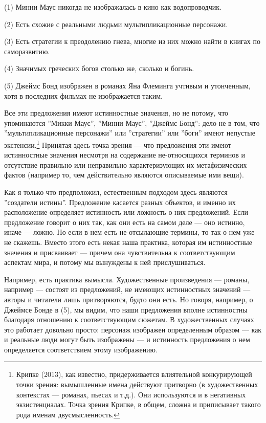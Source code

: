 \documentclass[11pt]{book}
\begin{document}
\smallskip

(1) Минни Маус никогда не изображалась в кино как водопроводчик.

(2) Есть схожие с реальными людьми мультипликационные персонажи.

(3) Есть стратегии к преодолению гнева, многие из них можно найти в книгах по саморазвитию.

(4) Значимых греческих богов столько же, сколько и богинь.

(5) Джеймс Бонд изображен в романах Яна Флеминга учтивым и утонченным, хотя в последних фильмах не изображается таким.

\smallskip

Все эти предложения имеют истинностные значения, но не потому, что упоминаются ''Микки Маус'', ''Минни Маус'', ''Джеймс Бонд'': дело не в том, что ''мультипликационные персонажи'' или ''стратегии'' или ''боги'' имеют непустые экстенсии.\footnote{Крипке (2013), как известно, придерживается влиятельной конкурирующей точки зрения: вымышленные имена действуют притворно (в художественных контекстах --- романах, пьесах и т.д.). Они используются и в негативных экзистенциалах. Точка зрения Крипке, в общем, сложна и приписывает такого рода именам двусмысленность.} Принятая здесь точка зрения --- что предложения эти имеют истинностные значения несмотря на содержание не-относящихся терминов и отсутствие правильно или неправильно характеризующих их метафизических фактов (например то, чем действительно являются описываемые ими вещи).

Как я только что предположил, естественным подходом здесь являются ''создатели истины''. Предложение касается разных объектов, и именно их расположение определяет истинность или ложность о них предложений. Если предложение говорит о них так, как они есть на самом деле --- оно истинно, иначе --- ложно. Но если в нем есть не-отсылающие термины, то так о нем уже не скажешь. Вместо этого есть некая наша практика, которая им истинностные значения и присваивает --- причем она чувствительна к соответствующим аспектам мира, и потому мы вынуждены к ней прислушиваться.

Например, есть практика вымысла. Художественные произведения --- романы, например --- состоят из предложений, не имеющих истинностных значений --- авторы и читатели лишь притворяются, будто они есть. Но говоря, например, о Джеймсе Бонде в (5), мы видим, что наши предложения вполне истинностны благодаря отношению к соответствующим сюжетам. В художественных случаях это работает довольно просто: персонаж изображен определенным образом --- как и реальные люди могут быть изображены --- и истинность предложения о нем определяется соответствием этому изображению.
\end{document}
